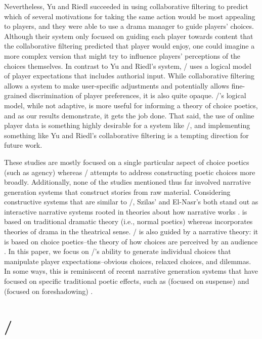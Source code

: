 Nevertheless, Yu and Riedl succeeded in using collaborative filtering to predict which of several motivations for taking the same action would be most appealing to players, and they were able to use a drama manager to guide players' choices.
%
Although their system only focused on guiding each player towards content that the collaborative filtering predicted that player would enjoy, one could imagine a more complex version that might try to influence players' perceptions of the choices themselves.
%
In contrast to Yu and Riedl's system, \dunyazad/ uses a logical model of player expectations that includes authorial input. 
%
While collaborative filtering allows a system to make user-specific adjustments and potentially allows fine-grained discrimination of player preferences, it is also quite opaque.
%
\dunyazad/'s logical model, while not adaptive, is more useful for informing a theory of choice poetics, and as our results demonstrate, it gets the job done.
%
That said, the use of online player data is something highly desirable for a system like \dunyazad/, and implementing something like Yu and Riedl's collaborative filtering is a tempting direction for future work.


These studies are mostly focused on a single particular aspect of choice poetics (such as agency) whereas \dunyazad/ attempts to address constructing poetic choices more broadly.
%
Additionally, none of the studies mentioned thus far involved narrative generation systems that construct stories from raw material.
%
Considering constructive systems that are similar to \dunyazad/, Szilas'  and El-Nasr's  both stand out as interactive narrative systems rooted in theories about how narrative works \citep{Szilas2003,El-Nasr2007}.
%
 is based on traditional dramatic theory (i.e., normal poetics) whereas  incorporates theories of drama in the theatrical sense.
%
\dunyazad/ is also guided by a narrative theory: it is based on choice poetics--the theory of how choices are perceived by an audience \citep{Mawhorter2014}.
%
In this paper, we focus on \dunyazad/'s ability to generate individual choices that manipulate player expectations--obvious choices, relaxed choices, and dilemmas.
%
In some ways, this is reminiscent of recent narrative generation systems that have focused on specific traditional poetic effects, such as  (focused on suspense) and  (focused on foreshadowing) \citep{Cheong2006,Bae2008}.


\section{\dunyazad/}

